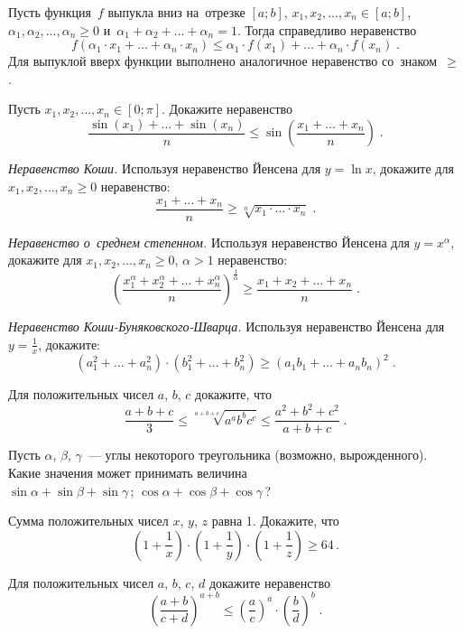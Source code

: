 \begin{problems}

\item{}
Пусть функция~$f$ выпукла вниз на~отрезке $[a;b]$,
$x_1, x_2, \ldots, x_n \in [a; b]$,
$\alpha_1, \alpha_2, \ldots, \alpha_n \geq 0$
и~$\alpha_1 + \alpha_2 + \ldots + \alpha_n = 1$.
Тогда справедливо неравенство
\[
    f(\alpha_1 \cdot x_1 + \ldots + \alpha_n \cdot x_n)
\leq
    \alpha_1 \cdot f(x_1) + \ldots + \alpha_n \cdot f(x_n)
\;.\]
Для выпуклой вверх функции выполнено аналогичное неравенство со~знаком~$\geq$.

\item
Пусть $x_1, x_2, \ldots, x_n \in [0; \pi]$.
Докажите неравенство 
\[
    \frac{\sin(x_1) + \ldots + \sin(x_n)}{n}
\leq
    \sin\left(
        \frac{x_1 + \ldots + x_n}{n}
    \right)
\;.\]

\item\emph{Неравенство Коши.}
Используя неравенство Йенсена для $y = \ln x$, докажите для
$x_1, x_2, \ldots, x_n \geq 0$ неравенство:
\[
    \frac{x_1 + \ldots + x_n}{n}
\geq
    \sqrt[n]{x_1 \cdot \ldots \cdot x_n}
\;.\]

\item\emph{Неравенство о~среднем степенном.}
Используя неравенство Йенсена для $y = x^{\alpha}$, докажите для
$x_1, x_2, \ldots, x_n \geq 0$, $\alpha > 1$ неравенство:
\[
    \left(
        \frac{
            x_1^{\alpha} + x_2^{\alpha} + \ldots + x_n^{\alpha}
        }{n}
    \right)^{\frac{1}{\alpha}}
\geq
    \frac{x_1 + x_2 + \ldots + x_n}{n}
\;.\]

\item\emph{Неравенство Коши-Буняковского-Шварца.}
Используя неравенство Йенсена для $y = \frac{1}{x}$, докажите:
\[
    (a_1^2 + \ldots + a_n^2) \cdot (b_1^2 + \ldots + b_n^2)
\geq
    (a_1 b_1 + \ldots + a_n b_n)^2
\;.\]

\item
Для положительных чисел $a$, $b$, $c$ докажите, что
\[
    \frac{a + b + c}{3}
\leq
    \sqrt[a+b+c]{a^a b^b c^c}
\leq
    \frac{a^2 + b^2 + c^2}{a + b + c}
\;.\]

\item
Пусть $\alpha$, $\beta$, $\gamma$~--- углы некоторого треугольника
(возможно, вырожденного).
Какие значения может принимать величина
\\
\subproblem $\sin \alpha + \sin \beta + \sin \gamma$\,;
\quad
\subproblem $\cos \alpha + \cos \beta + \cos \gamma$\,?

\item
Сумма положительных чисел $x$, $y$, $z$ равна 1.
Докажите, что
\[
    \left( 1 + \frac{1}{x} \right) \cdot
    \left( 1 + \frac{1}{y} \right) \cdot
    \left( 1 + \frac{1}{z} \right)
\geq
    64
\,.\]

\item
Для положительных чисел $a$, $b$, $c$, $d$ докажите неравенство
\[
    \left(\frac{a+b}{c+d}\right)^{a+b}
\leq
    \left(\frac{a}{c}\right)^a
    \cdot
    \left(\frac{b}{d}\right)^b
\;.\]

\end{problems}

